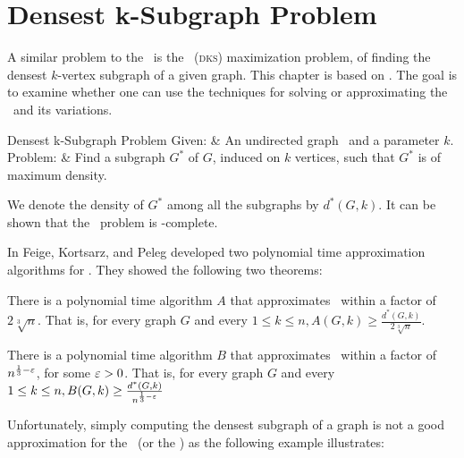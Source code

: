 \section{Densest k-Subgraph Problem}
\label{sec:dks}

A similar problem to the \WSP\ is the \DkS\ (\textsc{dks}) maximization problem, of finding the densest $k$-vertex subgraph of a given graph. This chapter is based on \cite{Feige97}. The goal is to examine whether one can use the techniques for solving or approximating the \WSP\ and its variations.

\begin{problembox}[framed]{Densest k-Subgraph Problem}
	Given: & An undirected graph \ugraph\ and a parameter $k$.\\
	Problem: & Find a subgraph $G^*$ of $G$, induced on $k$ vertices, such that $G^*$ is of maximum density.
	\label{problem:dks}
\end{problembox}\vspace{1em}

We denote the density of $G^*$ among all the subgraphs by $d^*(G,k)$. It can be shown that the \DkS\ problem is \NP-complete.\medskip

In \cite{Feige97} Feige, Kortsarz, and Peleg developed two polynomial time approximation algorithms for \DkS. They showed the following two theorems:

\begin{theorem}
	\label{thm:dksapprox}
	There is a polynomial time algorithm $A$ that approximates \DkS\ within a factor of $2\sqrt[3]{n}$. That is, for every graph $G$ and every $1 \leq k \leq n, A(G,k) \geq \frac{d^{*}(G,k)}{2\sqrt[3]{n}}$.
\end{theorem}

\begin{theorem}
	\label{thm:dksapprox2}
	There is a polynomial time algorithm $B$ that approximates \DkS\ within	a factor of $n^{\frac{1}{3} - \varepsilon}$, for some $\varepsilon > 0$. That is, for every graph $G$ and every $1 \leq k \leq n, B(G,k) \geq \frac{d^{*}(G,k)}{n^{\frac{1}{3} - \varepsilon}}$
\end{theorem}

Unfortunately, simply computing the densest subgraph of a graph is not a good approximation for the \WkSP\ (or the \WIkSP) as the following example illustrates: 

